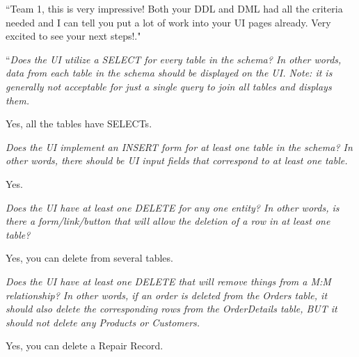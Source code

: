 \documentclass{article}
\begin{document}
\vspace{0.2cm}

\begin{tcolorbox}[colback=secondarycolor, colframe=primarycolor, title=\textbf{Step 3: TA Review - Madelyn Lazar}]
``Team 1, this is very impressive! Both your DDL and DML had all the criteria needed and I can tell you put a lot of work into your UI pages already. Very excited to see your next steps!."
\end{tcolorbox}

\vspace{0.5cm}
\begin{tcolorbox}[colback=secondarycolor, colframe=primarycolor, title=\textbf{Step 3: Peer Review 1 - Scott Dispensa}]
``\textit{Does the UI utilize a SELECT for every table in the schema? In other words, data from each table in the schema should be displayed on the UI. Note: it is generally not acceptable for just a single query to join all tables and displays them.}

\vspace{0.05cm}
 Yes, all the tables have SELECTs.

\vspace{0.2cm}
\textit{Does the UI implement an INSERT form for at least one table in the schema? In other words, there should be UI input fields that correspond to at least one table.}

\vspace{0.05cm}
 Yes.

\vspace{0.2cm}
\textit{Does the UI have at least one DELETE for any one entity? In other words, is there a form/link/button that will allow the deletion of a row in at least one table?}

\vspace{0.05cm}
Yes, you can delete from several tables.

\vspace{0.2cm}
\textit{Does the UI have at least one DELETE that will remove things from a M:M relationship? In other words, if an order is deleted from the Orders table, it should also delete the corresponding rows from the OrderDetails table, BUT it should not delete any Products or Customers.}

\vspace{0.05cm}
Yes, you can delete a Repair Record.


\end{tcolorbox}
\end{document}
